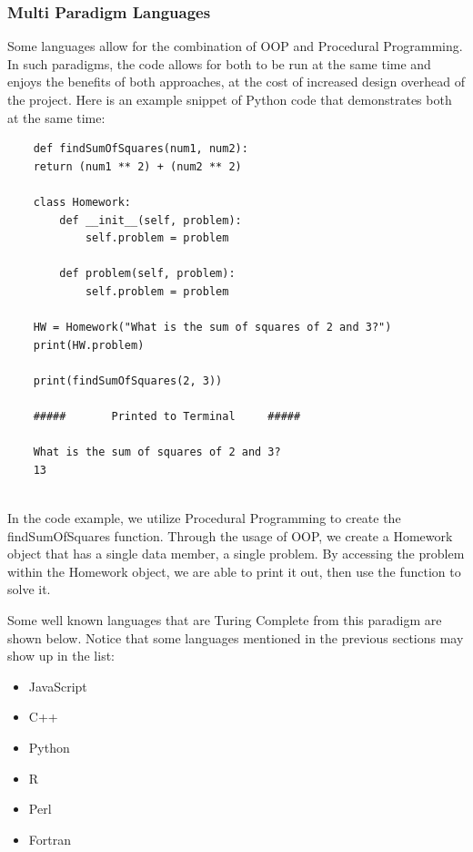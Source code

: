 \subsubsection{Multi Paradigm Languages}\label{subsubsec:MultiParadigmPL}

Some languages allow for the combination of OOP and Procedural Programming.
In such paradigms, the code allows for both to be run at the same time and enjoys the benefits of both approaches, at the cost of increased design overhead of the project.
Here is an example snippet of Python code that demonstrates both at the same time:

\begin{verbatim}
    def findSumOfSquares(num1, num2):
    return (num1 ** 2) + (num2 ** 2)

    class Homework:
        def __init__(self, problem):
            self.problem = problem
            
        def problem(self, problem):
            self.problem = problem

    HW = Homework("What is the sum of squares of 2 and 3?")
    print(HW.problem)

    print(findSumOfSquares(2, 3))

    #####       Printed to Terminal     #####

    What is the sum of squares of 2 and 3?
    13  
    
\end{verbatim}

In the code example, we utilize Procedural Programming to create the findSumOfSquares function.
Through the usage of OOP, we create a Homework object that has a single data member, a single problem.
By accessing the problem within the Homework object, we are able to print it out, then use the function to solve it.

Some well known languages that are Turing Complete from this paradigm are shown below.
Notice that some languages mentioned in the previous sections may show up in the list: 
\begin{itemize}
    \item JavaScript
    \item C++
    \item Python
    \item R
    \item Perl
    \item Fortran
\end{itemize}

